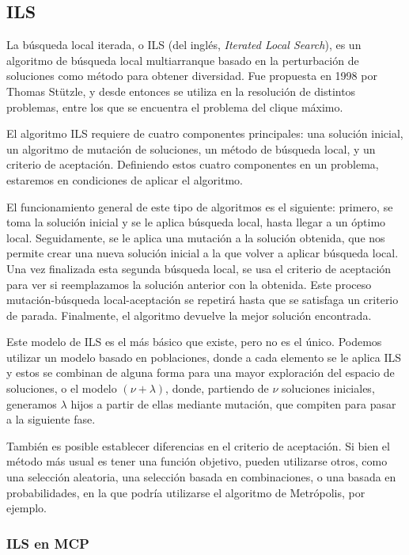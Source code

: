 \subsection{ILS}

La búsqueda local iterada, o ILS (del inglés, \textit{Iterated Local Search}), es
un algoritmo de búsqueda local multiarranque basado en la perturbación de soluciones
como método para obtener diversidad. Fue propuesta en 1998 por Thomas Stützle,
y desde entonces se utiliza en la resolución de distintos problemas, entre los
que se encuentra el problema del clique máximo.

El algoritmo ILS requiere de cuatro componentes principales: una solución inicial,
un algoritmo de mutación de soluciones, un método de búsqueda local, y un criterio
de aceptación. Definiendo estos cuatro componentes en un problema, estaremos en
condiciones de aplicar el algoritmo.

El funcionamiento general de este tipo de algoritmos es el siguiente: primero, se
toma la solución inicial y se le aplica búsqueda local, hasta llegar a un óptimo local.
Seguidamente, se le aplica una mutación a la solución obtenida, que nos permite crear
una nueva solución inicial a la que volver a aplicar búsqueda local. Una vez finalizada
esta segunda búsqueda local, se usa el criterio de aceptación para ver si reemplazamos
la solución anterior con la obtenida. Este proceso mutación-búsqueda local-aceptación
se repetirá hasta que se satisfaga un criterio de parada. Finalmente, el algoritmo
devuelve la mejor solución encontrada.

Este modelo de ILS es el más básico que existe, pero no es el único. Podemos utilizar
un modelo basado en poblaciones, donde a cada elemento se le aplica ILS y estos se
combinan de alguna forma para una mayor exploración del espacio de soluciones, o el
modelo $(\nu + \lambda)$, donde, partiendo de $\nu$ soluciones iniciales, generamos
$\lambda$ hijos a partir de ellas mediante mutación, que compiten para pasar a la siguiente fase.

También es posible establecer diferencias en el criterio de aceptación. Si bien el
método más usual es tener una función objetivo, pueden utilizarse otros, como una
selección aleatoria, una selección basada en combinaciones, o una basada en probabilidades,
en la que podría utilizarse el algoritmo de Metrópolis, por ejemplo.

\subsubsection{ILS en MCP}

